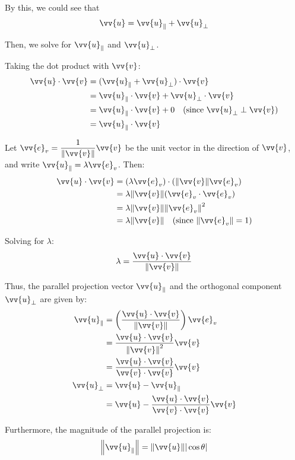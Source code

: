 \begin{example}
By this, we could see that 
\[
\vv{u} = \vv{u}_{\parallel} + \vv{u}_{\perp}
\]

Then, we solve for $\vv{u}_{\parallel}$ and $\vv{u}_{\perp}$.

Taking the dot product with $\vv{v}$:
\begin{align*}
\vv{u} \cdot \vv{v} &= (\vv{u}_{\parallel} + \vv{u}_{\perp}) \cdot \vv{v} \\
                    &= \vv{u}_{\parallel} \cdot \vv{v} + \vv{u}_{\perp} \cdot \vv{v} \\
                    &= \vv{u}_{\parallel} \cdot \vv{v} + 0 \quad \text{(since } \vv{u}_{\perp} \perp \vv{v}\text{)} \\
                    &= \vv{u}_{\parallel} \cdot \vv{v}
\end{align*}

Let $\vv{e}_{v} = \displaystyle\frac{1}{\norm{\vv{v}}} \vv{v}$ be the unit vector in the direction of $\vv{v}$, and write $\vv{u}_{\parallel} = \lambda \vv{e}_{v}$. Then:
\begin{align*}
\vv{u} \cdot \vv{v} &= (\lambda \vv{e}_{v}) \cdot (\norm{\vv{v}} \vv{e}_{v}) \\
                    &= \lambda \norm{\vv{v}} (\vv{e}_{v} \cdot \vv{e}_{v}) \\
                    &= \lambda \norm{\vv{v}} \norm{\vv{e}_{v}}^2 \\
                    &= \lambda \norm{\vv{v}} \quad \text{(since } \norm{\vv{e}_{v}} = 1\text{)}
\end{align*}

Solving for $\lambda$:
\[
\lambda = \frac{\vv{u} \cdot \vv{v}}{\norm{\vv{v}}}
\]

Thus, the parallel projection vector $\vv{u}_{\parallel}$ and the orthogonal component $\vv{u}_{\perp}$ are given by:
\begin{align*}
\vv{u}_{\parallel} &= \left(\frac{\vv{u} \cdot \vv{v}}{\norm{\vv{v}}}\right) \vv{e}_v \\
                   &= \frac{\vv{u} \cdot \vv{v}}{\norm{\vv{v}}^2} \vv{v} \\
                   &= \frac{\vv{u} \cdot \vv{v}}{\vv{v} \cdot \vv{v}} \vv{v} \\
\vv{u}_{\perp} &= \vv{u} - \vv{u}_{\parallel} \\
               &= \vv{u} - \frac{\vv{u} \cdot \vv{v}}{\vv{v} \cdot \vv{v}} \vv{v}
\end{align*}

Furthermore, the magnitude of the parallel projection is:
\[
\norm{\vv{u}_{\parallel}} = \norm{\vv{u}} |\cos \theta|
\]

\end{example}

